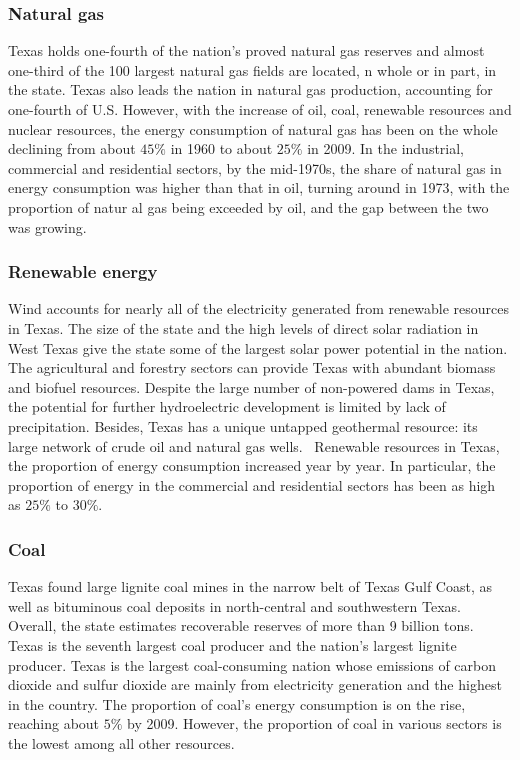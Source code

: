 \documentclass{mcmthesis}
\begin{document}
\subsubsection{Natural gas}
  Texas holds one-fourth of the nation's proved natural gas reserves and almost one-third of the 100 largest natural gas fields are located,
  n whole or in part, in the state. Texas also leads the nation in natural gas production, accounting for one-fourth of U.S. However,
  with the increase of oil, coal, renewable resources and nuclear resources, the energy consumption of natural gas has been on the
  whole declining from about $45\%$ in 1960 to about $25\%$ in 2009. In the industrial, commercial and residential sectors,
  by the mid-1970s, the share of natural gas in energy consumption was higher than that in oil, turning around in 1973,
  with the proportion of natur  al gas being exceeded by oil, and the gap between the two was growing.
\subsubsection{Renewable energy}
  Wind accounts for nearly all of the electricity generated from renewable resources in Texas. The size of the state and
  the high levels of direct solar radiation in West Texas give the state some of the largest solar power potential in the nation.
  The agricultural and forestry sectors can provide Texas with abundant biomass and biofuel resources.
  Despite the large number of non-powered dams in Texas, the potential for further hydroelectric development is limited by lack of precipitation.
  Besides, Texas has a unique untapped geothermal resource: its large network of crude oil and natural gas wells. 
  Renewable resources in Texas, the proportion of energy consumption increased year by year.
  In particular, the proportion of energy in the commercial and residential sectors has been as high as $25\%$ to $30\%$.
\subsubsection{Coal}
  Texas found large lignite coal mines in the narrow belt of Texas Gulf Coast, as well as bituminous coal deposits in north-central
  and southwestern Texas. Overall, the state estimates recoverable reserves of more than 9 billion tons.
  Texas is the seventh largest coal producer and the nation's largest lignite producer. Texas is the largest coal-consuming nation
  whose emissions of carbon dioxide and sulfur dioxide are mainly from electricity generation and the highest in the country.
  The proportion of coal's energy consumption is on the rise, reaching about $5\%$ by 2009. However, the proportion of coal in
  various sectors is the lowest among all other resources.
\end{document}
